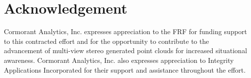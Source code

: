 \documentclass{report}
\begin{document}
%	
	
	\chapter*{Acknowledgement}
	Cormorant Analytics, Inc. expresses appreciation to the FRF for funding support to this contracted effort and for the opportunity to contribute to the advancement of multi-view stereo generated point clouds for increased situational awareness.  Cormorant Analytics, Inc. also expresses appreciation to Integrity Applications Incorporated for their support and assistance throughout the effort.
\end{document}
